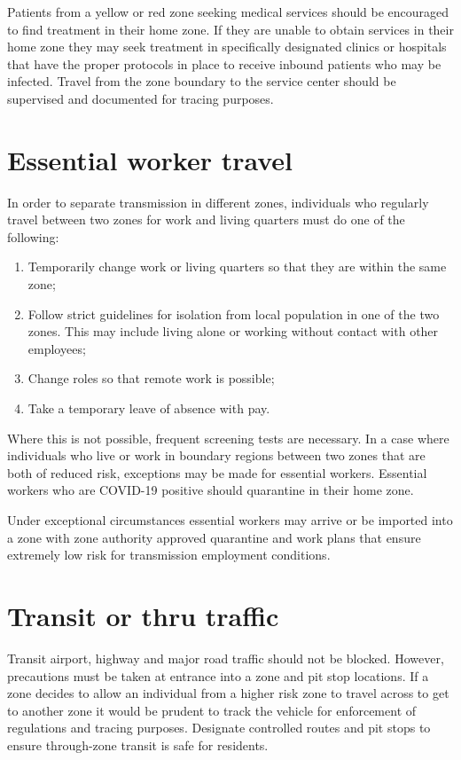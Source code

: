 \documentclass[onecolumn,journal]{IEEEtran}
\begin{document}
\begin{multicols}{2}
Patients from a yellow or red zone seeking medical services should be encouraged to find treatment in their home zone. If they are unable to obtain services in their home zone they may seek treatment in specifically designated clinics or hospitals that have the proper protocols in place to receive inbound patients who may be infected. Travel from the zone boundary to the service center should be supervised and documented for tracing purposes.

\section{Essential worker travel}

In order to separate transmission in different zones, individuals who regularly travel between two zones for work and living quarters must do one of the following:

\begin{enumerate}
\item Temporarily change work or living quarters so that they are within the same zone;
\item Follow strict guidelines for isolation from local population in one of the two zones. This may include living alone or working without contact with other employees;
\item Change roles so that remote work is possible;
\item Take a temporary leave of absence with pay.
\end{enumerate}
Where this is not possible, frequent screening tests are necessary. In a case where individuals who live or work in boundary regions between two zones that are both of reduced risk, exceptions may be made for essential workers. Essential workers who are COVID-19 positive should quarantine in their home zone.

Under exceptional circumstances essential workers may arrive or be imported into a zone with zone authority approved quarantine and work plans that ensure extremely low risk for transmission employment conditions. 

\section{Transit or thru traffic}

Transit airport, highway and major road traffic should not be blocked. However, precautions must be taken at entrance into a zone and pit stop locations. If a zone decides to allow an individual from a higher risk zone to travel across to get to another zone it would be prudent to track the vehicle for enforcement of regulations and tracing purposes. Designate controlled routes and pit stops to ensure through-zone transit is safe for residents.


\end{multicols}
\end{document}
